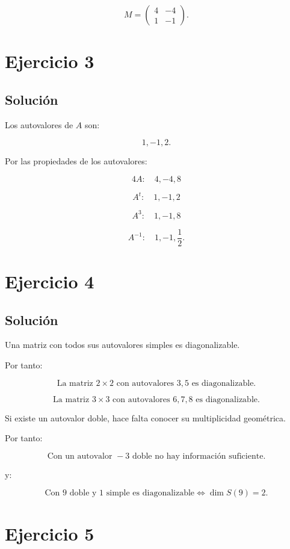 \documentclass[11pt,a4paper]{article}
\begin{document}
\[
\boxed{
M=
\begin{pmatrix}
4&-4\\
1&-1
\end{pmatrix}.
}
\]

\section{Ejercicio 3}
\subsection{Solución}

Los autovalores de $A$ son:

\[
1,-1,2.
\]

Por las propiedades de los autovalores:

\[
\boxed{
4A:\quad 4,-4,8
}
\]

\[
\boxed{
A^t:\quad 1,-1,2
}
\]

\[
\boxed{
A^3:\quad 1,-1,8
}
\]

\[
\boxed{
A^{-1}:\quad 1,-1,\frac12.
}
\]

\section{Ejercicio 4}
\subsection{Solución}

Una matriz con todos sus autovalores simples es diagonalizable.

Por tanto:

\[
\boxed{
\text{La matriz }2\times2\text{ con autovalores }3,5\text{ es diagonalizable.}
}
\]

\[
\boxed{
\text{La matriz }3\times3\text{ con autovalores }6,7,8\text{ es diagonalizable.}
}
\]

Si existe un autovalor doble, hace falta conocer su multiplicidad geométrica.

Por tanto:

\[
\boxed{
\text{Con un autovalor }-3\text{ doble no hay información suficiente.}
}
\]

y:

\[
\boxed{
\text{Con }9\text{ doble y }1\text{ simple es diagonalizable}
\iff
\dim S(9)=2.
}
\]

\section{Ejercicio 5}
\end{document}
